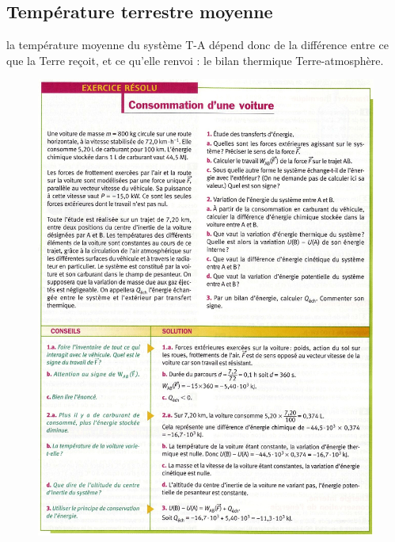 \documentclass[11pt,a4paper]{article}
\begin{document}
\subsection{Température terrestre moyenne}

la température moyenne du système T-A dépend donc de la différence entre ce que la Terre reçoit, et ce qu'elle renvoi : le bilan thermique Terre-atmosphère. 

\begin{figure}[h]
    \centering
    \includegraphics[width=\linewidth]{imgs/p4/xo1.jpg}
\end{figure}
\end{document}

